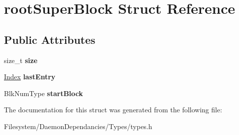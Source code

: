 \hypertarget{structrootSuperBlock}{}\section{root\+Super\+Block Struct Reference}
\label{structrootSuperBlock}
\subsection*{Public Attributes}
\begin{DoxyCompactItemize}
\item 
size\+\_\+t {\bfseries size}\hypertarget{structrootSuperBlock_a346c6cd3ede82eb90190548d45c1789d}{}\label{structrootSuperBlock_a346c6cd3ede82eb90190548d45c1789d}

\item 
\hyperlink{structindex}{Index} {\bfseries last\+Entry}\hypertarget{structrootSuperBlock_ac316fdcc2d2736d675980495d1732872}{}\label{structrootSuperBlock_ac316fdcc2d2736d675980495d1732872}

\item 
Blk\+Num\+Type {\bfseries start\+Block}\hypertarget{structrootSuperBlock_afb7d56b6d69b3f1555db0e3bce1d9612}{}\label{structrootSuperBlock_afb7d56b6d69b3f1555db0e3bce1d9612}

\end{DoxyCompactItemize}


The documentation for this struct was generated from the following file\+:\begin{DoxyCompactItemize}
\item 
Filesystem/\+Daemon\+Dependancies/\+Types/types.\+h\end{DoxyCompactItemize}
